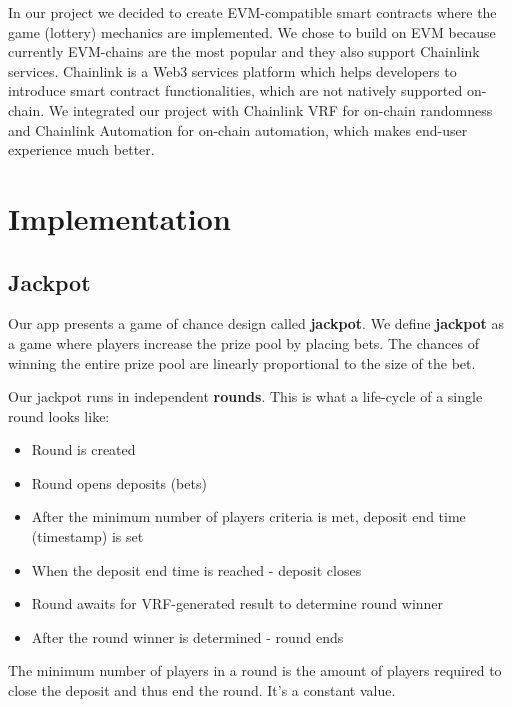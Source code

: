 \documentclass[12pt]{article}
\begin{document}
In our project we decided to create EVM-compatible smart contracts where the game (lottery) mechanics are implemented. We chose to build on EVM\cite{evm} because currently EVM-chains are the most popular and they also support Chainlink services.
Chainlink\cite{chainlink} is a Web3 services platform which helps developers to introduce smart contract functionalities, which are not natively supported on-chain. We integrated our project with Chainlink VRF\cite{vrf} for on-chain randomness and Chainlink Automation\cite{automation} for on-chain automation, which makes end-user experience much better.


\newpage
\section{Implementation}
\subsection{Jackpot}

Our app presents a game of chance design called \textbf{jackpot}. We define \textbf{jackpot} as a game where players increase the prize pool by placing bets. The chances of winning the entire prize pool are linearly proportional to the size of the bet.

Our jackpot runs in independent \textbf{rounds}. This is what a life-cycle of a single round looks like:

\begin{itemize}
    \item Round is created
    \item Round opens deposits (bets)
    \item After the minimum number of players criteria is met, deposit end time (timestamp) is set 
    \item When the deposit end time is reached - deposit closes
    \item Round awaits for VRF-generated result to determine round winner
    \item After the round winner is determined - round ends
\end{itemize}

The minimum number of players in a round is the amount of players required to close the deposit and thus end the round. It's a constant value.
\end{document}
